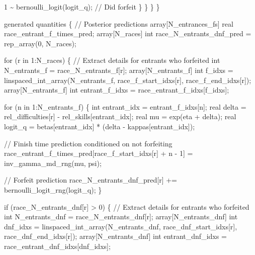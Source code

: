 \documentclass[
  letterpaper,
  DIV=11,
  numbers=noendperiod]{scrartcl}
\newenvironment{Shaded}{\begin{snugshade}}{\end{snugshade}}
\newcommand{\CommentTok}[1]{\textcolor[rgb]{0.37,0.37,0.37}{#1}}
\newcommand{\ControlFlowTok}[1]{\textcolor[rgb]{0.00,0.23,0.31}{#1}}
\newcommand{\DataTypeTok}[1]{\textcolor[rgb]{0.68,0.00,0.00}{#1}}
\newcommand{\DecValTok}[1]{\textcolor[rgb]{0.68,0.00,0.00}{#1}}
\newcommand{\KeywordTok}[1]{\textcolor[rgb]{0.00,0.23,0.31}{#1}}
\newcommand{\NormalTok}[1]{\textcolor[rgb]{0.00,0.23,0.31}{#1}}
\begin{document}
\begin{codelisting}
\begin{Shaded}
\begin{Highlighting}[]
        \DecValTok{1}\NormalTok{ \textasciitilde{} bernoulli\_logit(logit\_q); }\CommentTok{// Did forfeit}
\NormalTok{      \}}
\NormalTok{    \}}
\NormalTok{  \}}
\NormalTok{\}}

\KeywordTok{generated quantities}\NormalTok{ \{}
  \CommentTok{// Posterior predictions}
  \DataTypeTok{array}\NormalTok{[N\_entrances\_fs] }\DataTypeTok{real}\NormalTok{ race\_entrant\_f\_times\_pred;}
  \DataTypeTok{array}\NormalTok{[N\_races] }\DataTypeTok{int}\NormalTok{ race\_N\_entrants\_dnf\_pred = rep\_array(}\DecValTok{0}\NormalTok{, N\_races);}

  \ControlFlowTok{for}\NormalTok{ (r }\ControlFlowTok{in} \DecValTok{1}\NormalTok{:N\_races) \{}
    \CommentTok{// Extract details for entrants who forfeited}
    \DataTypeTok{int}\NormalTok{ N\_entrants\_f = race\_N\_entrants\_f[r];}
    \DataTypeTok{array}\NormalTok{[N\_entrants\_f] }\DataTypeTok{int}\NormalTok{ f\_idxs}
\NormalTok{      = linspaced\_int\_array(N\_entrants\_f,}
\NormalTok{                            race\_f\_start\_idxs[r],}
\NormalTok{                            race\_f\_end\_idxs[r]);}
    \DataTypeTok{array}\NormalTok{[N\_entrants\_f] }\DataTypeTok{int}\NormalTok{ entrant\_f\_idxs}
\NormalTok{      = race\_entrant\_f\_idxs[f\_idxs];}

    \ControlFlowTok{for}\NormalTok{ (n }\ControlFlowTok{in} \DecValTok{1}\NormalTok{:N\_entrants\_f) \{}
      \DataTypeTok{int}\NormalTok{ entrant\_idx = entrant\_f\_idxs[n];}
      \DataTypeTok{real}\NormalTok{ delta = rel\_difficulties[r] {-} rel\_skills[entrant\_idx];}
      \DataTypeTok{real}\NormalTok{ mu = exp(eta + delta);}
      \DataTypeTok{real}\NormalTok{ logit\_q = betas[entrant\_idx] * (delta {-} kappas[entrant\_idx]);}

      \CommentTok{// Finish time prediction conditioned on not forfeiting}
\NormalTok{      race\_entrant\_f\_times\_pred[race\_f\_start\_idxs[r] + n {-} }\DecValTok{1}\NormalTok{]}
\NormalTok{        = inv\_gamma\_md\_rng(mu, psi);}

      \CommentTok{// Forfeit prediction}
\NormalTok{      race\_N\_entrants\_dnf\_pred[r] += bernoulli\_logit\_rng(logit\_q);}
\NormalTok{    \}}

    \ControlFlowTok{if}\NormalTok{ (race\_N\_entrants\_dnf[r] \textgreater{} }\DecValTok{0}\NormalTok{) \{}
      \CommentTok{// Extract details for entrants who forfeited}
      \DataTypeTok{int}\NormalTok{ N\_entrants\_dnf = race\_N\_entrants\_dnf[r];}
      \DataTypeTok{array}\NormalTok{[N\_entrants\_dnf]}
        \DataTypeTok{int}\NormalTok{ dnf\_idxs = linspaced\_int\_array(N\_entrants\_dnf,}
\NormalTok{                                           race\_dnf\_start\_idxs[r],}
\NormalTok{                                           race\_dnf\_end\_idxs[r]);}
      \DataTypeTok{array}\NormalTok{[N\_entrants\_dnf]}
        \DataTypeTok{int}\NormalTok{ entrant\_dnf\_idxs = race\_entrant\_dnf\_idxs[dnf\_idxs];}


\end{Highlighting}
\end{Shaded}
\end{codelisting}
\end{document}
